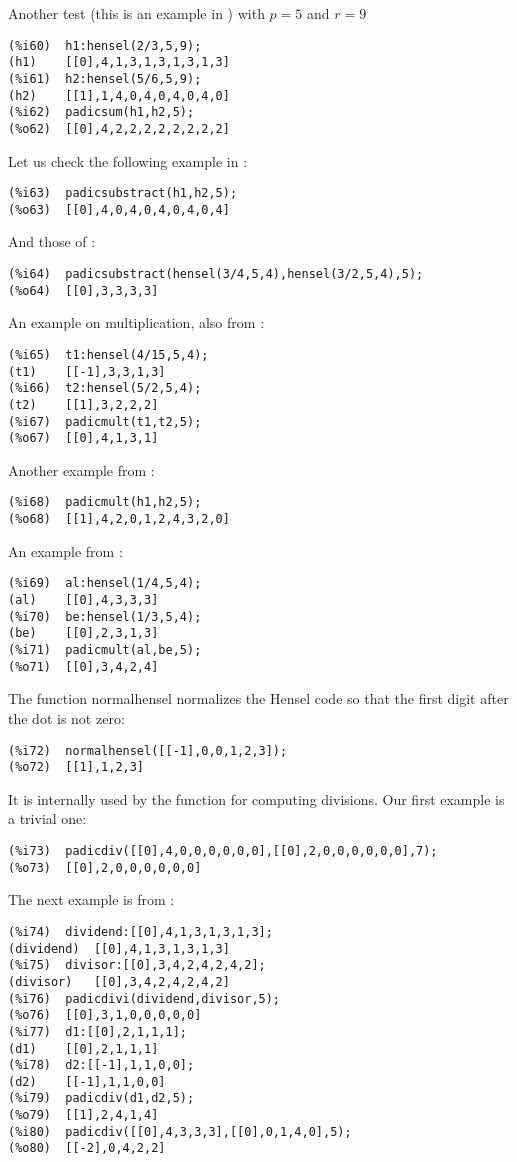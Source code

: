\documentclass[fleqn]{cas-sc}
\begin{document}
Another test (this is an example in \cite{2}) with $p=5$ and $r=9$
\begin{verbatim}
(%i60)	h1:hensel(2/3,5,9);
(h1)	[[0],4,1,3,1,3,1,3,1,3]
(%i61)	h2:hensel(5/6,5,9);
(h2)	[[1],1,4,0,4,0,4,0,4,0]
(%i62)	padicsum(h1,h2,5);
(%o62)	[[0],4,2,2,2,2,2,2,2,2]
\end{verbatim}

Let us check the following example in \cite{2}:
\begin{verbatim}
(%i63)	padicsubstract(h1,h2,5);
(%o63)	[[0],4,0,4,0,4,0,4,0,4]
\end{verbatim}

And those of \cite{3}:
\begin{verbatim}
(%i64)	padicsubstract(hensel(3/4,5,4),hensel(3/2,5,4),5);
(%o64)	[[0],3,3,3,3]
\end{verbatim}

An example on multiplication, also from \cite{3}:
\begin{verbatim}
(%i65)	t1:hensel(4/15,5,4);
(t1)	[[-1],3,3,1,3]
(%i66)	t2:hensel(5/2,5,4);
(t2)	[[1],3,2,2,2]
(%i67)	padicmult(t1,t2,5);
(%o67)	[[0],4,1,3,1]
\end{verbatim}

Another example from \cite{2}:
\begin{verbatim}
(%i68)	padicmult(h1,h2,5);
(%o68)	[[1],4,2,0,1,2,4,3,2,0]
\end{verbatim}

An example from \cite{4}:
\begin{verbatim}
(%i69)	al:hensel(1/4,5,4);
(al)	[[0],4,3,3,3]
(%i70)	be:hensel(1/3,5,4);
(be)	[[0],2,3,1,3]
(%i71)	padicmult(al,be,5);
(%o71)	[[0],3,4,2,4]
\end{verbatim}

The function normalhensel normalizes the Hensel code so that the
first digit after the dot is not zero:
\begin{verbatim}
(%i72)	normalhensel([[-1],0,0,1,2,3]);
(%o72)	[[1],1,2,3]
\end{verbatim}
It is internally used by the function for computing divisions. Our first
example is a trivial one:
\begin{verbatim}
(%i73)	padicdiv([[0],4,0,0,0,0,0,0],[[0],2,0,0,0,0,0,0],7);
(%o73)	[[0],2,0,0,0,0,0,0]
\end{verbatim}

The next example is from \cite{2}:
\begin{verbatim}
(%i74)	dividend:[[0],4,1,3,1,3,1,3];
(dividend)	[[0],4,1,3,1,3,1,3]
(%i75)	divisor:[[0],3,4,2,4,2,4,2];
(divisor)	[[0],3,4,2,4,2,4,2]
(%i76)	padicdivi(dividend,divisor,5);
(%o76)	[[0],3,1,0,0,0,0,0]
(%i77)	d1:[[0],2,1,1,1];
(d1)	[[0],2,1,1,1]
(%i78)	d2:[[-1],1,1,0,0];
(d2)	[[-1],1,1,0,0]
(%i79)	padicdiv(d1,d2,5);
(%o79)	[[1],2,4,1,4]
(%i80)	padicdiv([[0],4,3,3,3],[[0],0,1,4,0],5);
(%o80)	[[-2],0,4,2,2]
\end{verbatim}
\end{document}

